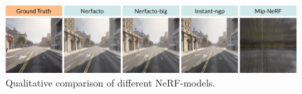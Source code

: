 \begin{figure}[ht]
    \centering
    \includegraphics[width=1.0\textwidth]{figures/different-models.png}
    \caption{Qualitative comparison of different NeRF-models.}
    \label{fig:different-models}
\end{figure}